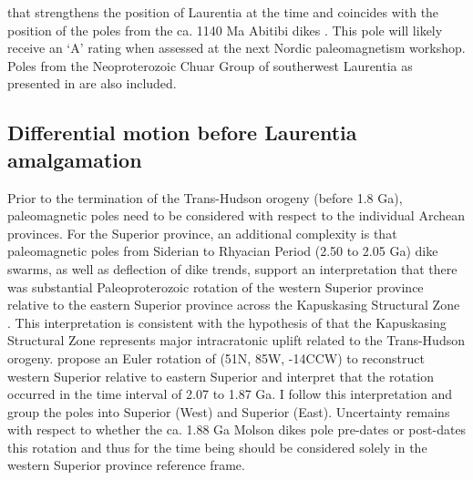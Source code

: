 \documentclass[11pt,letterpaper]{article}
\begin{document}
that strengthens the position of Laurentia at the time and coincides with the position of the poles from the ca. 1140 Ma Abitibi dikes \citep{Ernst1993a}. This pole will likely receive an `A' rating when assessed at the next Nordic paleomagnetism workshop. Poles from the Neoproterozoic Chuar Group of southerwest Laurentia as presented in \cite{Eyster2019a} are also included.

\subsection{Differential motion before Laurentia amalgamation}

Prior to the termination of the Trans-Hudson orogeny (before 1.8 Ga), paleomagnetic poles need to be considered with respect to the individual Archean provinces. For the Superior province, an additional complexity is that paleomagnetic poles from Siderian to Rhyacian Period (2.50 to 2.05 Ga) dike swarms, as well as deflection of dike trends, support an interpretation that there was substantial Paleoproterozoic rotation of the western Superior province relative to the eastern Superior province across the Kapuskasing Structural Zone \citep{Bates1991a, Evans2010a}. This interpretation is consistent with the hypothesis of \citet{Hoffman1988a} that the Kapuskasing Structural Zone represents major intracratonic uplift related to the Trans-Hudson orogeny. \cite{Evans2010a} propose an Euler rotation of (51\textdegree N, 85\textdegree W, -14\textdegree CCW) to reconstruct western Superior relative to eastern Superior and interpret that the rotation occurred in the time interval of 2.07 to 1.87 Ga.  I follow this interpretation and group the poles into Superior (West) and Superior (East).  Uncertainty remains with respect to whether the ca. 1.88 Ga Molson dikes pole pre-dates or post-dates this rotation \citep{Evans2010a} and thus for the time being should be considered solely in the western Superior province reference frame.
\end{document}
